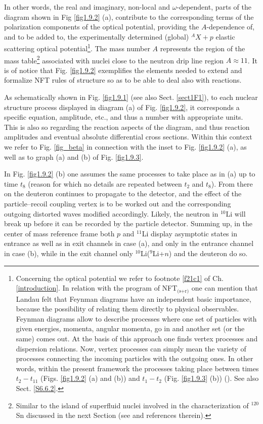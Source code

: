 In other words, the real and imaginary, non-local and $\omega$-dependent, parts of the diagram shown in Fig \ref{fig1.9.2} (a), contribute to the corresponding terms of the polarization components of the optical potential, providing the $A$-dependence of, and to be added to, the experimentally determined (global) $^AX+p$ elastic scattering optical potential\footnote{Concerning the optical potential we refer to footnote \ref{f21c1} of Ch. \ref{introduction}. In relation with the program of NFT$_{\text{(s+r)}}$ one can mention that Landau felt that  Feynman diagrams have an independent basic importance, because the possibility of relating them directly to physical observables. Feynman diagrams allow to describe processes where one set of particles with given energies, momenta, angular momenta, go in and another set (or the same) comes out. At the basis of this approach one finds vertex processes and dispersion relations. Now, vertex processes can simply mean the variety of processes connecting the incoming particles with the outgoing ones. In other words, within the present framework the processes taking place between times $t_2-t_{11}$ (Figs. \ref{fig1.9.2} (a) and (b)) and $t_1-t_2$ (Fig. \ref{fig1.9.3} (b)) (\cite{Landau:59,terHaar:69}). See also Sect. \ref{S6.6.2}.}. The mass number $A$ represents the region of the mass table\footnote{Similar to the island of superfluid nuclei involved in the characterization of $^{120}$Sn discussed in the next Section (see \cite{Idini:15} and references therein).} associated with nuclei close to the neutron  drip line region $A\approx11$.
  It is of
notice that Fig. \ref{fig1.9.2} exemplifies  the elements needed to extend and formalize NFT rules of
structure so as to be able to deal also with reactions.

As schematically shown in Fig. \ref{fig1.9.1} (see also Sect. \ref{sect1F1}), to each nuclear structure process displayed in diagram (a) of Fig. \ref{fig1.9.2}, it corresponds a specific equation, amplitude, etc., and thus a number with appropriate units. This is also so regarding the reaction aspects of the diagram, and thus reaction amplitudes and eventual absolute differential cross sections.
Within this context we refer to Fig. \ref{fig_beta} in connection with the inset to Fig. \ref{fig1.9.2} (a), as well as to graph (a) and (b) of Fig. \ref{fig1.9.3}.


 In Fig. \ref{fig1.9.2} (b) one assumes the same processes to take place  as in (a) up to time $t_8$ (reason for which no details
are repeated between $t_2$ and $t_8$). From there on the deuteron continues to propagate to
the detector, and the effect of the particle--recoil coupling vertex is to be worked out and the corresponding outgoing distorted waves modified accordingly. Likely, the neutron in $^{10}$Li will break up
before it can be recorded by the particle detector. Summing up, in the center of mass reference frame both $p$ and $^{11}$Li
display asymptotic states in entrance as well as in exit channels in case (a), and only
in the entrance channel in case (b), while in the exit channel only $^{10}$Li($^9$Li+$n$) and the
deuteron do so. 

